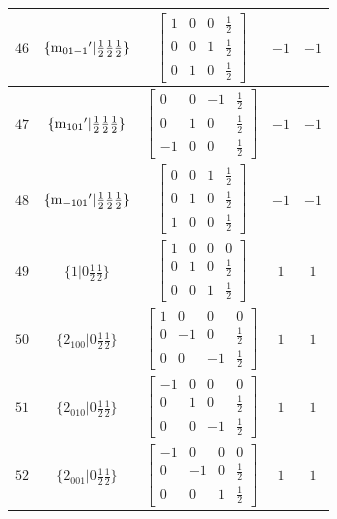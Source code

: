 \documentclass[fleqn,8pt]{jsarticle}
\begin{document}
\begin{longtable}{ccccc}
$ 46 $ & $ \{{\rm m}_{01-1}{}'|\frac{1}{2} \frac{1}{2} \frac{1}{2}\} $ & $ \begin{bmatrix} 1 & 0 & 0 & \frac{1}{2} \\ 0 & 0 & 1 & \frac{1}{2} \\ 0 & 1 & 0 & \frac{1}{2} \end{bmatrix} $ & $ -1 $ & $ -1 $ \\ \hline
$ 47 $ & $ \{{\rm m}_{101}{}'|\frac{1}{2} \frac{1}{2} \frac{1}{2}\} $ & $ \begin{bmatrix} 0 & 0 & -1 & \frac{1}{2} \\ 0 & 1 & 0 & \frac{1}{2} \\ -1 & 0 & 0 & \frac{1}{2} \end{bmatrix} $ & $ -1 $ & $ -1 $ \\ \hline
$ 48 $ & $ \{{\rm m}_{-101}{}'|\frac{1}{2} \frac{1}{2} \frac{1}{2}\} $ & $ \begin{bmatrix} 0 & 0 & 1 & \frac{1}{2} \\ 0 & 1 & 0 & \frac{1}{2} \\ 1 & 0 & 0 & \frac{1}{2} \end{bmatrix} $ & $ -1 $ & $ -1 $ \\ \hline
$ 49 $ & $ \{1|0 \frac{1}{2} \frac{1}{2}\} $ & $ \begin{bmatrix} 1 & 0 & 0 & 0 \\ 0 & 1 & 0 & \frac{1}{2} \\ 0 & 0 & 1 & \frac{1}{2} \end{bmatrix} $ & $ 1 $ & $ 1 $ \\ \hline
$ 50 $ & $ \{2{}_{100}|0 \frac{1}{2} \frac{1}{2}\} $ & $ \begin{bmatrix} 1 & 0 & 0 & 0 \\ 0 & -1 & 0 & \frac{1}{2} \\ 0 & 0 & -1 & \frac{1}{2} \end{bmatrix} $ & $ 1 $ & $ 1 $ \\ \hline
$ 51 $ & $ \{2{}_{010}|0 \frac{1}{2} \frac{1}{2}\} $ & $ \begin{bmatrix} -1 & 0 & 0 & 0 \\ 0 & 1 & 0 & \frac{1}{2} \\ 0 & 0 & -1 & \frac{1}{2} \end{bmatrix} $ & $ 1 $ & $ 1 $ \\ \hline
$ 52 $ & $ \{2{}_{001}|0 \frac{1}{2} \frac{1}{2}\} $ & $ \begin{bmatrix} -1 & 0 & 0 & 0 \\ 0 & -1 & 0 & \frac{1}{2} \\ 0 & 0 & 1 & \frac{1}{2} \end{bmatrix} $ & $ 1 $ & $ 1 $ \\ \hline

\end{longtable}
\end{document}
